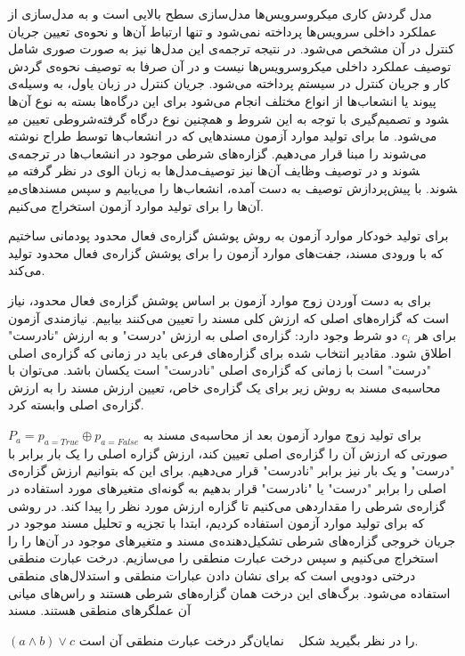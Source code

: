 مدل‌ گردش کاری میکروسرویس‌ها مدل‌سازی سطح بالایی است و به مدل‌سازی از عملکرد داخلی سرویس‌ها پرداخته نمی‌شود و تنها ارتباط آن‌ها و نحوه‌ی تعیین جریان کنترل در آن مشخص می‌شود. در نتیجه ترجمه‌ی این مدل‌ها نیز به صورت صوری شامل توصیف عملکرد داخلی میکروسرویس‌ها نیست و در آن صرفا به توصیف نحوه‌ی گردش کار و جریان کنترل در سیستم پرداخته می‌شود. جریان کنترل در زبان‌ یاول، به وسیله‌ی پیوند یا انشعاب‌ها از انواع مختلف انجام می‌شود برای این درگاه‌ها بسته به نوع آن‌ها شروطی تعیین می‎شود و تصمیم‌گیری با توجه به این شروط و همچنین نوع درگاه گرفته می‌شود. 
ما برای تولید موارد آزمون مسندهایی که در انشعاب‌ها توسط طراح نوشته می‌شوند را مبنا قرار می‌دهیم. گزاره‌های شرطی موجود در انشعاب‌ها در ترجمه‌ی مدل‌ها به زبان الوی در نظر گرفته می‎شوند و در توصیف وظایف آن‌ها نیز توصیف می‎شوند. با پیش‌پردازش توصیف به دست ‌آمده، انشعاب‌ها را می‌یابیم و سپس مسندهای آن‌ها را برای تولید موارد آزمون استخراج می‌کنیم. 

برای تولید خودکار موارد آزمون به روش پوشش گزاره‌ی فعال محدود پودمانی ساختیم که با ورودی مسند، جفت‌های موارد آزمون را برای پوشش گزاره‌ی فعال محدود تولید می‌کند. 

برای به دست آوردن زوج موارد آزمون بر اساس پوشش گزاره‌ی فعال محدود، نیاز است که گزاره‌های اصلی که ارزش کلی مسند را تعیین می‌کنند بیابیم. نیازمندی آزمون برای هر
 $c_i$
 دو شرط وجود دارد: گزاره‌ی اصلی به ارزش "درست" و به ارزش "نادرست" اطلاق شود. مقادیر انتخاب شده برای گزاره‌های فرعی باید در زمانی که گزاره‌ی اصلی "درست" است با زمانی که گزاره‌ی اصلی  "نادرست" است یکسان باشد.
می‌توان با محاسبه‌ی مسند به روش زیر برای یک گزاره‌ی خاص، تعیین ارزش مسند را به ارزش گزاره‌ی اصلی وابسته کرد.
 
$P_a = p_{a=True}\oplus p_{a=False}$\newline
برای تولید زوج موارد آزمون بعد از محاسبه‌ی مسند به صورتی که ارزش آن را گزاره‌ی اصلی تعیین کند، ارزش گزاره اصلی را یک بار برابر با "درست" و یک بار نیز برابر "نادرست" قرار می‌دهیم. برای این که بتوانیم ارزش گزاره‌ی اصلی را برابر "درست" یا "نادرست" قرار بدهیم به گونه‌ای متغیر‌های مورد استفاده در گزاره‌ی شرطی را مقداردهی می‌کنیم تا گزاره ارزش مورد نظر را پیدا کند.
در روشی که برای تولید موارد آزمون استفاده کردیم، ابتدا با تجزیه و تحلیل مسند موجود در جریان خروجی گزاره‌های شرطی تشکیل‌دهنده‌ی مسند و متغیرهای موجود در آن‌ها را را استخراج می‌کنیم و  سپس درخت عبارت منطقی را می‌سازیم. درخت عبارت منطقی درختی دودویی است که برای نشان دادن عبارات منطقی و استدلال‌های منطقی استفاده می‌شود. برگ‌های این درخت همان گزاره‌های شرطی هستند و راس‌های میانی آن عملگرهای منطقی هستند. مسند

$(a \wedge b) \vee c$\newline
 را در نظر بگیرید شکل ~ نمایان‌گر درخت عبارت منطقی آن است.


